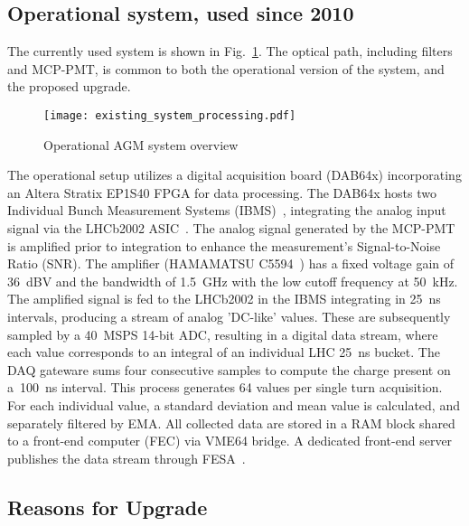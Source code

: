 \subsection{Operational system, used since 2010}
The currently used system is shown in Fig.~\ref{fig:current_system_processing}.
%
The optical path, including filters and MCP-PMT, is common to both the operational version of the system, and the proposed upgrade.
\begin{figure}[!tbh]
    \centering
    \texttt{[image: existing\_system\_processing.pdf]}
    \caption{Operational AGM system overview}
    \label{fig:current_system_processing}
\end{figure}
The operational setup utilizes a digital acquisition board (DAB64x) incorporating an Altera Stratix EP1S40 FPGA for data processing.
%
The DAB64x hosts two Individual Bunch Measurement Systems (IBMS)~\cite{ibms}, integrating the analog input signal via the LHCb2002 ASIC~\cite{lhcb_asic}.
%
The analog signal generated by  the MCP-PMT is amplified  prior to integration to  enhance the measurement's Signal-to-Noise Ratio  (SNR).
%
The amplifier (HAMAMATSU C5594~\cite{bsra_first_operation}) has a fixed voltage gain of \SI{36}{dBV} and the bandwidth of \SI{1.5}{GHz} with the low cutoff frequency at \SI{50}{kHz}.
%
The amplified signal is fed to the LHCb2002 in the IBMS integrating in \SI{25}{\nano\second} intervals, producing a stream of analog  'DC-like' values.
%
These are subsequently sampled by a \SI{40}{MSPS} 14-bit ADC, resulting in a digital data stream, where each value corresponds to an integral of an individual LHC \SI{25}{ns} bucket.
%
The DAQ gateware sums four consecutive samples to compute the charge present on a~\SI{100}{ns} interval.
%
This process generates 64 values per single turn acquisition.
%
For each individual value, a standard deviation and mean value is calculated, and separately filtered by EMA. 
%
All collected data are stored in a RAM block shared to a front-end computer (FEC) via VME64 bridge.
%
A dedicated  front-end  server publishes the data stream through FESA~\cite{fesa}.


\subsection{Reasons for Upgrade}

